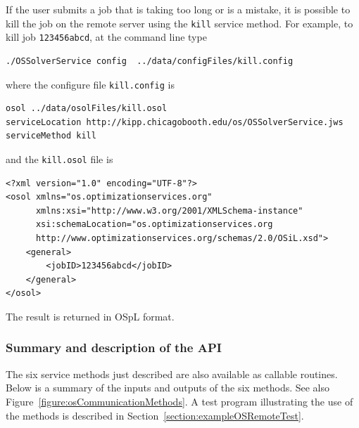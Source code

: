 If the user submits a job that is taking too long or is a mistake, it is possible to kill the job on the remote server using the {\tt kill} service method.
For example, to kill job {\tt 123456abcd}, at the command line type
\begin{verbatim}
./OSSolverService config  ../data/configFiles/kill.config
\end{verbatim}
where the configure file {\tt kill.config} is
\begin{verbatim}
osol ../data/osolFiles/kill.osol
serviceLocation http://kipp.chicagobooth.edu/os/OSSolverService.jws
serviceMethod kill
\end{verbatim}
and the {\tt kill.osol} file is
\begin{verbatim}
<?xml version="1.0" encoding="UTF-8"?>
<osol xmlns="os.optimizationservices.org"
      xmlns:xsi="http://www.w3.org/2001/XMLSchema-instance"
      xsi:schemaLocation="os.optimizationservices.org
      http://www.optimizationservices.org/schemas/2.0/OSiL.xsd">
    <general>
        <jobID>123456abcd</jobID>
    </general>
</osol>
\end{verbatim}

The result is returned in  OSpL format.



\subsubsection{Summary and description of the API}

The six service methods just described are also available as callable routines.
Below is a summary of the inputs and outputs of the six methods. See also Figure~\ref{figure:osCommunicationMethods}.
A test program illustrating the use of the methods is described in Section~\ref{section:exampleOSRemoteTest}.

